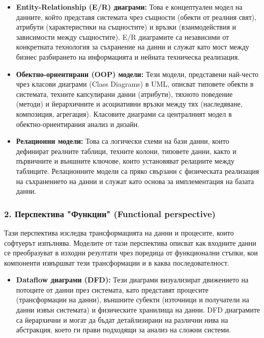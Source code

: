 \documentclass{scrartcl}
\begin{document}
\begin{FlushLeft}
\begin{itemize}
    \item \textbf{Entity-Relationship (E/R) диаграми:} Това е концептуален модел на данните, който представя системата чрез същности (обекти от реалния свят), атрибути (характеристики на същностите) и връзки (взаимодействия и зависимости между същностите). E/R диаграмите са независими от конкретната технология за съхранение на данни и служат като мост между бизнес разбирането на информацията и нейната техническа реализация.
    
    \item \textbf{Обектно-ориентирани (OOP) модели:} Тези модели, представени най-често чрез класови диаграми (Class Diagrams) в UML, описват типовете обекти в системата, техните капсулирани данни (атрибути), тяхното поведение (методи) и йерархичните и асоциативни връзки между тях (наследяване, композиция, агрегация). Класовите диаграми са централният модел в обектно-ориентирания анализ и дизайн.
    
    \item \textbf{Релационни модели:} Това са логически схеми на бази данни, които дефинират реалните таблици, техните колони, типовете данни, както и първичните и външните ключове, които установяват релациите между таблиците. Релационните модели са пряко свързани с физическата реализация на съхранението на данни и служат като основа за имплементация на базата данни.
\end{itemize}

\subsubsection{2. Перспектива "Функции" (Functional perspective)}

Тази перспектива изследва трансформацията на данни и процесите, които софтуерът изпълнява. Моделите от тази перспектива описват как входните данни се преобразуват в изходни резултати чрез поредица от функционални стъпки, кои компоненти извършват тези трансформации и в каква последователност.

\begin{itemize}
    \item \textbf{Dataflow диаграми (DFD):} Тези диаграми визуализират движението на потоците от данни през системата, като представят процесите (трансформации на данни), външните субекти (източници и получатели на данни извън системата) и физическите хранилища на данни. DFD диаграмите са йерархични и могат да бъдат детайлизирани на различни нива на абстракция, което ги прави подходящи за анализ на сложни системи.
    

\end{itemize}
\end{FlushLeft}
\end{document}
